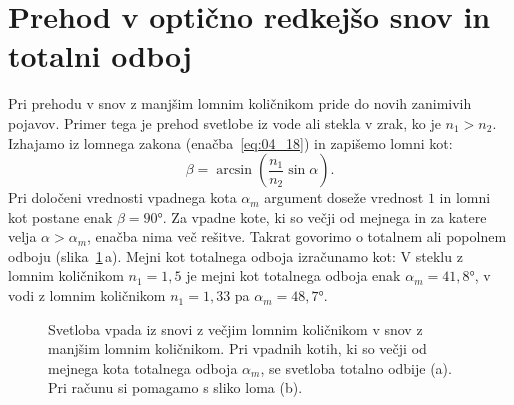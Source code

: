 \section{Prehod v optično redkejšo snov in totalni odboj}
Pri prehodu v snov z manjšim lomnim količnikom pride do novih zanimivih pojavov.
Primer tega je prehod svetlobe iz vode ali stekla v zrak, ko je $n_1>n_2$.
Izhajamo iz lomnega zakona (enačba~\ref{eq:04_18}) in zapišemo lomni kot:
\begin{equation}
\beta = \arcsin \left(\frac{n_1}{n_2}\sin \alpha\right)\!\!.
\label{eq:04_52}
\end{equation}
Pri določeni vrednosti vpadnega kota $\alpha_m$ 
argument doseže vrednost $1$ in lomni kot
postane enak $\beta = 90\si{\degree}$. Za vpadne kote, ki so večji od 
mejnega in za katere velja
$\alpha> \alpha_m$, enačba nima več rešitve. Takrat govorimo o totalnem 
ali popolnem odboju (slika~\ref{fig:04_totalni}\,a). Mejni kot 
totalnega odboja izračunamo kot:
V steklu z lomnim količnikom $n_1=1,5$ je mejni kot totalnega odboja
enak $\alpha_m = 41,8\si{\degree}$, v vodi z lomnim količnikom 
$n_1 = 1,33$ pa $\alpha_m = 48,7\si{\degree}$.
\begin{figure}[ht]
\centering
\def\svgwidth{140truemm} 

\caption{Svetloba vpada iz snovi z večjim lomnim količnikom v snov z manjšim lomnim količnikom.
Pri vpadnih kotih, ki so večji od mejnega kota totalnega odboja $\alpha_m$, se svetloba totalno odbije (a). Pri računu
si pomagamo s sliko loma (b).}
\label{fig:04_totalni}
\end{figure}

